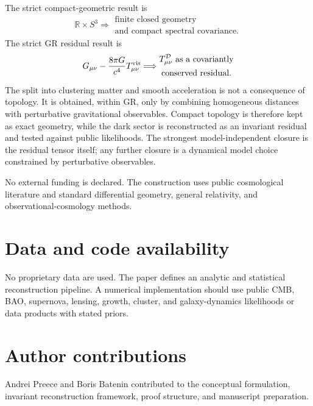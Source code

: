 \documentclass[
  aps,
  prd,
  reprint,
  superscriptaddress,
  nofootinbib,
  floatfix,
  longbibliography
]{revtex4-2}
\theoremstyle{plain}
\theoremstyle{definition}
\theoremstyle{remark}
\newcommand{\RR}{\mathbb R}
\newcommand{\D}{\mathcal D}
\begin{document}
The strict compact-geometric result is
\begin{equation}
\RR\times S^3
\Longrightarrow
\begin{gathered}
\text{finite closed geometry}\\
\text{and compact spectral covariance}.
\end{gathered}
\end{equation}
The strict GR residual result is
\begin{equation}
G_{\mu\nu}-\frac{8\pi G}{c^4}T^{\rm vis}_{\mu\nu}
\Longrightarrow
\begin{gathered}
T^\D_{\mu\nu}\ \text{as a covariantly}\\
\text{conserved residual}.
\end{gathered}
\end{equation}
The split into clustering matter and smooth acceleration is not a consequence
of topology.  It is obtained, within GR, only by combining homogeneous
distances with perturbative gravitational observables.  Compact topology is
therefore kept as exact geometry, while the dark sector is reconstructed as an
invariant residual and tested against public likelihoods.  The strongest
model-independent closure is the residual tensor itself; any further closure is
a dynamical model choice constrained by perturbative observables.

\begin{acknowledgments}
No external funding is declared.  The construction uses public cosmological
literature and standard differential geometry, general relativity, and
observational-cosmology methods.
\end{acknowledgments}

\section*{Data and code availability}
No proprietary data are used.  The paper defines an analytic and statistical
reconstruction pipeline.  A numerical implementation should use public CMB,
BAO, supernova, lensing, growth, cluster, and galaxy-dynamics likelihoods or
data products with stated priors.

\section*{Author contributions}
Andrei Preece and Boris Batenin contributed to the conceptual formulation,
invariant reconstruction framework, proof structure, and manuscript preparation.
\end{document}
